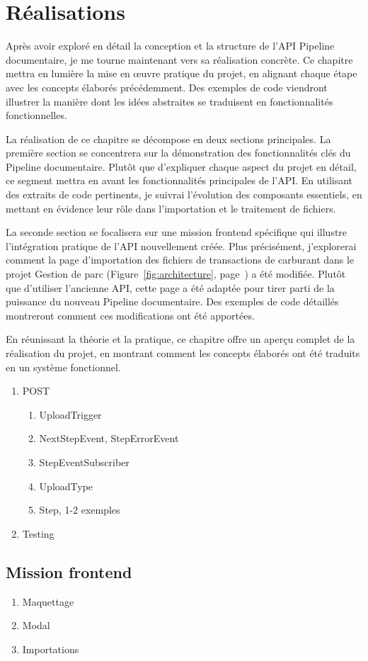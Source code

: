 \chapter{Réalisations}\label{ch:realisations}

Après avoir exploré en détail la conception et la structure de l'API Pipeline documentaire, je me tourne maintenant vers sa réalisation concrète. Ce chapitre mettra en lumière la mise en œuvre pratique du projet, en alignant chaque étape avec les concepts élaborés précédemment. Des exemples de code viendront illustrer la manière dont les idées abstraites se traduisent en fonctionnalités fonctionnelles.

La réalisation de ce chapitre se décompose en deux sections principales. La première section se concentrera sur la démonstration des fonctionnalités clés du Pipeline documentaire. Plutôt que d'expliquer chaque aspect du projet en détail, ce segment mettra en avant les fonctionnalités principales de l'API. En utilisant des extraits de code pertinents, je suivrai l'évolution des composants essentiels, en mettant en évidence leur rôle dans l'importation et le traitement de fichiers.

La seconde section se focalisera sur une mission frontend spécifique qui illustre l'intégration pratique de l'API nouvellement créée. Plus précisément, j'explorerai comment la page d'importation des fichiers de transactions de carburant dans le projet Gestion de parc (Figure~\ref{fig:architecture}, page~\pageref{fig:architecture}) a été modifiée. Plutôt que d'utiliser l'ancienne API, cette page a été adaptée pour tirer parti de la puissance du nouveau Pipeline documentaire. Des exemples de code détaillés montreront comment ces modifications ont été apportées.

En réunissant la théorie et la pratique, ce chapitre offre un aperçu complet de la réalisation du projet, en montrant comment les concepts élaborés ont été traduits en un système fonctionnel.



\begin{enumerate}
    \item POST
          \begin{enumerate}
              \item UploadTrigger
              \item NextStepEvent, StepErrorEvent
              \item StepEventSubscriber
              \item UploadType
              \item Step, 1-2 exemples
          \end{enumerate}
    \item Testing
\end{enumerate}

\section{Mission frontend}

\begin{enumerate}
    \item Maquettage
    \item Modal
    \item Importations
\end{enumerate}